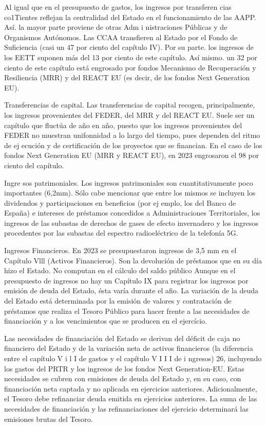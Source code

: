 \documentclass[10pt,a4paper]{article}
\begin{document}
Al igual que en el presupuesto de gastos, los ingresos por transferen cias co1Tientes reflejan la centralidad del Estado en el funcionamiento de las AAPP. Así. la mayor parte proviene de otras Adm i nistraciones Públicas y de Organismos Autónomos. Las CCAA transfieren al Estado por el Fondo de Suficiencia (casi un 47 por ciento del capítulo IV). Por su parte. los ingresos de los EETT suponen más del 13 por ciento de este capítulo. Así mismo. un 32 por ciento de este capítulo está engrosado por fondos Mecanismo de Recuperación y Resiliencia (MRR) y del REACT EU (es decir, de los fondos Next Generation EU).

Transferencias de capital. Las transferencias de capital recogen, principalmente, los ingresos provenientes del FEDER, del MRR y del REACT EU. Suele ser un capítulo que fluctúa de año en año, puesto que los ingresos provenientes del FEDER no muestran unifonnidad a lo largo del tiempo, pues dependen del ritmo de ej ecución y de certificación de los proyectos que se financian. En el caso de los fondos Next Generation EU (MRR y REACT EU), en 2023 engrosaron el 98 por ciento del capítulo.

Ingre sos patrimoniales. Los ingresos patrimoniales son cuantitativamente poco importantes (6,2mm). Sólo cabe mencionar que entre los mismos se incluyen los dividendos y participaciones en beneficios (por ej emplo, los del Banco de España) e intereses de préstamos concedidos a Administraciones Territoriales, los ingresos de las subastas de derechos de gases de efecto invernadero y los ingresos procedentes por las subastas del espectro radioeléctrico de la telefonía 5G.

Ingresos Financieros. En 2023 se presupuestaron ingresos de 3,5 mm en el Capítulo Vlll (Activos Financieros). Son la devolución de préstamos que en su día hizo el Estado. No computan en el cálculo del saldo público Aunque en el presupuesto de ingresos no hay un Capítulo IX para registrar los ingresos por emisión de deuda del Estado, ésta varía durante el afio. La variación de la deuda del Estado está determinada por la emisión de valores y contratación de préstamos que realiza el Tesoro Público para hacer frente a las necesidades de financiación y a los vencimientos que se producen en el ejercício.

Las necesidades de financiación del Estado se derivan del déficit de caja no financiero del Estado y de la variación neta de activos financieros (la diferencia entre el capítulo V i l I de gastos y el capítulo V I I I de i ngresos) 26, incluyendo los gastos del PRTR y los ingresos de los fondos Next Generation-EU. Estas necesidades se cubren con emisiones de deuda del Estado y, en su caso, con financiación neta captada y no aplicada en ejercicios anteriores. Adicionalmente, el Tesoro debe refinanciar deuda emitida en ejercicios anteriores. La suma de las necesidades de financiación y las refinanciaciones del ejercicio determinará las emisiones brutas del Tesoro.
\end{document}
